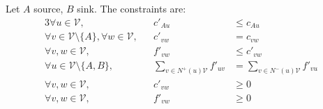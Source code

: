 Let $A$ source, $B$ sink. The constraints are:
\begin{alignat*}{3}
  \forall u \in \mathcal{V},&& c'_{Au} &\leq c_{Au} \\
  \forall v \in \mathcal{V} \setminus \{A\}, \forall w \in \mathcal{V},&&  c'_{vw} &= c_{vw} \\
  \forall v,w \in \mathcal{V},&&  f'_{vw} &\leq c'_{vw} \\
  \forall u \in \mathcal{V} \setminus \{A, B\},&&
  \sum\limits_{v \in N^{+}\left(u\right) \mathcal{V}}f'_{uv} &=
  \sum\limits_{v \in N^{-}\left(u\right) \mathcal{V}}f'_{vu} \\
  \forall v,w \in \mathcal{V}, && c'_{vw} &\geq 0 \\
  \forall v,w \in \mathcal{V}, && f'_{vw} &\geq 0
\end{alignat*}


